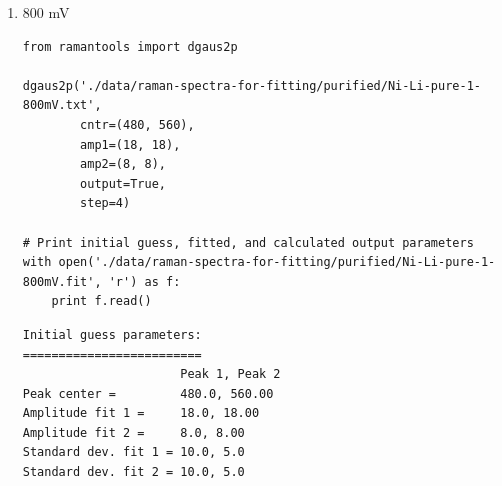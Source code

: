 \documentclass[journal=jpccck,manuscript=suppinfo,email=true]{achemso}
\begin{document}
\begin{enumerate}
\begin{enumerate}
\begin{enumerate}
\begin{verbatim}
dgaus2p('./data/raman-spectra-for-fitting/purified/Ni-Li-pure-1-700mV.txt',
        cntr=(480, 560),
        amp1=(12, 12),
        amp2=(5, 5),
        output=True,
        step=4)

# Print initial guess, fitted, and calculated output parameters
with open('./data/raman-spectra-for-fitting/purified/Ni-Li-pure-1-700mV.fit', 'r') as f:
    print f.read()
\end{verbatim}

\begin{verbatim}
Initial guess parameters:
=========================
                      Peak 1, Peak 2
Peak center =         480.0, 560.00
Amplitude fit 1 =     12.0, 12.00
Amplitude fit 2 =     5.0, 5.00
Standard dev. fit 1 = 10.0, 5.0
Standard dev. fit 2 = 10.0, 5.0

Baseline parameters:
=========================
Slope =               -0.01
Intercept =           10.27

Fitted parameters:
=========================
                      Peak 1, Peak 2
Peak center =         480.87, 561.94
Amplitude fit 1 =     5.30, 17.46
Amplitude fit 2 =     6.28, 6.96
Standard dev. fit 1 = 23.36, 7.78
Standard dev. fit 2 = 31.53, 6.82

Calculation output:
========================
Mean peak 1 =         480.9 $\pm$ 0.23
Mean peak 2 =         561.9 $\pm$ 0.53
Height peak 1 =       28.6 $\pm$ 0.38
Height peak 2 =       18.3 $\pm$ 0.37
Area peak 1 =         920.1
Area peak 2 =         869.3
\end{verbatim}

\item 800 mV
\label{sec-4-1-0-1-1-3}
\begin{verbatim}
from ramantools import dgaus2p

dgaus2p('./data/raman-spectra-for-fitting/purified/Ni-Li-pure-1-800mV.txt',
        cntr=(480, 560),
        amp1=(18, 18),
        amp2=(8, 8),
        output=True,
        step=4)

# Print initial guess, fitted, and calculated output parameters
with open('./data/raman-spectra-for-fitting/purified/Ni-Li-pure-1-800mV.fit', 'r') as f:
    print f.read()
\end{verbatim}

\begin{verbatim}
Initial guess parameters:
=========================
                      Peak 1, Peak 2
Peak center =         480.0, 560.00
Amplitude fit 1 =     18.0, 18.00
Amplitude fit 2 =     8.0, 8.00
Standard dev. fit 1 = 10.0, 5.0
Standard dev. fit 2 = 10.0, 5.0


\end{verbatim}
\end{enumerate}
\end{enumerate}
\end{enumerate}
\end{document}
